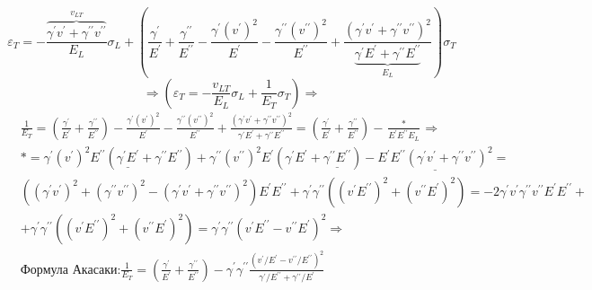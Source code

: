 $$
\varepsilon_T=-\frac{\overbrace{\gamma^{\prime} v^{\prime}+\gamma^{\prime \prime} v^{\prime \prime}}^{v_{L T}}}{E_L} \sigma_L+\left(\frac{\gamma^{\prime}}{E^{\prime}}+\frac{\gamma^{\prime \prime}}{E^{\prime \prime}}-\frac{\gamma^{\prime}\left(v^{\prime}\right)^2}{E^{\prime}}-\frac{\gamma^{\prime \prime}\left(v^{\prime \prime}\right)^2}{E^{\prime \prime}}+\frac{\left(\gamma^{\prime} v^{\prime}+\gamma^{\prime \prime} v^{\prime \prime}\right)^2}{\underbrace{\gamma^{\prime} E^{\prime}+\gamma^{\prime \prime} E^{\prime \prime}}_{E_L}}\right) \sigma_T 
$$
$$
\Rightarrow 
(\varepsilon_T=-\frac{v_{LT}}{E_L}\sigma_L+\frac{1}{E_T}\sigma_T) \Rightarrow
$$
$$
\displaystyle
\begin{aligned}
& \frac{1}{E_T}=\left(\frac{\gamma^{\prime}}{E^{\prime}}+\frac{\gamma^{\prime \prime}}{E^{\prime \prime}}\right)-\frac{\gamma^{\prime}\left(v^{\prime}\right)^2}{E^{\prime}}-\frac{\gamma^{\prime \prime}\left(v^{\prime \prime}\right)^2}{E^{\prime \prime}}+\frac{\left(\gamma^{\prime} v^{\prime}+\gamma^{\prime \prime} v^{\prime \prime}\right)^2}{\gamma^{\prime} E^{\prime}+\gamma^{\prime \prime} E^{\prime \prime}}=\left(\frac{\gamma^{\prime}}{E^{\prime}}+\frac{\gamma^{\prime \prime}}{E^{\prime \prime}}\right)-\frac{*}{E^{\prime} E^{\prime \prime} E_L} \Rightarrow \\
& *=\gamma^{\prime}\left(v^{\prime}\right)^2 E^{\prime \prime}\left(\underline{\gamma^{\prime} E^{\prime}}+\gamma^{\prime \prime} E^{\prime \prime}\right)+\gamma^{\prime \prime}\left(v^{\prime \prime}\right)^2 E^{\prime}\left(\gamma^{\prime} E^{\prime}+\underline{\gamma^{\prime \prime} E^{\prime \prime}}\right)-\underline{E^{\prime} E^{\prime \prime}\left(\gamma^{\prime} v^{\prime}+\gamma^{\prime \prime} v^{\prime \prime}\right)^2}= \\
& \left(\left(\gamma^{\prime} v^{\prime}\right)^2+\left(\gamma^{\prime \prime} v^{\prime \prime}\right)^2-\left(\gamma^{\prime} v^{\prime}+\gamma^{\prime \prime} v^{\prime \prime}\right)^2\right) E^{\prime} E^{\prime \prime}+\gamma^{\prime} \gamma^{\prime \prime}\left(\left(v^{\prime} E^{\prime \prime}\right)^2+\left(v^{\prime \prime} E^{\prime}\right)^2\right)=-2 \gamma^{\prime} v^{\prime} \gamma^{\prime \prime} v^{\prime \prime} E^{\prime} E^{\prime \prime}+ \\
& +\gamma^{\prime} \gamma^{\prime \prime}\left(\left(v^{\prime} E^{\prime \prime}\right)^2+\left(v^{\prime \prime} E^{\prime}\right)^2\right)=\gamma^{\prime} \gamma^{\prime \prime}\left(v^{\prime} E^{\prime \prime}-v^{\prime \prime} E^{\prime}\right)^2 \Rightarrow 
\\& \textbf{Формула Акасаки:} \frac{1}{E_T}=\left(\frac{\gamma^{\prime}}{E^{\prime}}+\frac{\gamma^{\prime \prime}}{E^{\prime \prime}}\right)-\gamma^{\prime} \gamma^{\prime \prime} \frac{\left(v^{\prime} / E^{\prime}-v^{\prime \prime} / E^{\prime \prime}\right)^2}{\gamma^{\prime} / E^{\prime \prime}+\gamma^{\prime \prime} / E^{\prime}} \\

\end{aligned}$$
